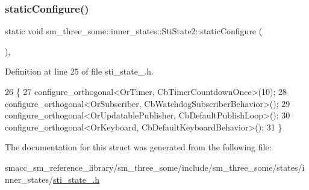 \subsubsection{\texorpdfstring{static\+Configure()}{staticConfigure()}}
{\footnotesize\ttfamily static void sm\+\_\+three\+\_\+some\+::inner\+\_\+states\+::\+Sti\+State2\+::static\+Configure (\begin{DoxyParamCaption}{ }\end{DoxyParamCaption})\hspace{0.3cm}{\ttfamily [inline]}, {\ttfamily [static]}}



Definition at line 25 of file sti\+\_\+state\+\_.\+h.


\begin{DoxyCode}
26   \{
27     configure\_orthogonal<OrTimer, CbTimerCountdownOnce>(10);
28     configure\_orthogonal<OrSubscriber, CbWatchdogSubscriberBehavior>();
29     configure\_orthogonal<OrUpdatablePublisher, CbDefaultPublishLoop>();
30     configure\_orthogonal<OrKeyboard, CbDefaultKeyboardBehavior>();
31   \}
\end{DoxyCode}


The documentation for this struct was generated from the following file\+:\begin{DoxyCompactItemize}
\item 
smacc\+\_\+sm\+\_\+reference\+\_\+library/sm\+\_\+three\+\_\+some/include/sm\+\_\+three\+\_\+some/states/inner\+\_\+states/\hyperlink{sti__state__2_8h}{sti\+\_\+state\+\_.\+h}\end{DoxyCompactItemize}
